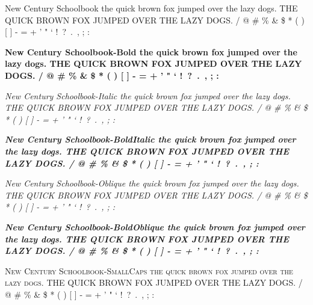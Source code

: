 \documentclass{article}
\begin{document}
{\selectfont
New Century Schoolbook \newline
the quick brown fox jumped over the lazy dogs. \newline
THE QUICK BROWN FOX JUMPED OVER THE LAZY DOGS.  / @ \# \% \& \$ * ( ) [ ] - = + ' " ` !\ ?\ .\ , ; :  \par
{\bfseries
New Century Schoolbook-Bold \newline
the quick brown fox jumped over the lazy dogs. \newline
THE QUICK BROWN FOX JUMPED OVER THE LAZY DOGS.  / @ \# \% \& \$ * ( ) [ ] - = + ' " ` !\ ?\ .\ , ; : } \par
{\itshape
New Century Schoolbook-Italic \newline
the quick brown fox jumped over the lazy dogs. \newline
THE QUICK BROWN FOX JUMPED OVER THE LAZY DOGS.  / @ \# \% \& \$ * ( ) [ ] - = + ' " ` !\ ?\ .\ , ; : } \par
{\bfseries \itshape
New Century Schoolbook-BoldItalic \newline
the quick brown fox jumped over the lazy dogs. \newline
THE QUICK BROWN FOX JUMPED OVER THE LAZY DOGS.  / @ \# \% \& \$ * ( ) [ ] - = + ' " ` !\ ?\ .\ , ; : } \par
{\slshape
New Century Schoolbook-Oblique \newline
the quick brown fox jumped over the lazy dogs. \newline
THE QUICK BROWN FOX JUMPED OVER THE LAZY DOGS.  / @ \# \% \& \$ * ( ) [ ] - = + ' " ` !\ ?\ .\ , ; : } \par
{\bfseries \slshape
New Century Schoolbook-BoldOblique \newline
the quick brown fox jumped over the lazy dogs. \newline
THE QUICK BROWN FOX JUMPED OVER THE LAZY DOGS.  / @ \# \% \& \$ * ( ) [ ] - = + ' " ` !\ ?\ .\ , ; : } \par
{\scshape
New Century Schoolbook-SmallCaps \newline
the quick brown fox jumped over the lazy dogs. \newline
THE QUICK BROWN FOX JUMPED OVER THE LAZY DOGS.  / @ \# \% \& \$ * ( ) [ ] - = + ' " ` !\ ?\ .\ , ; : }} \par
\end{document}
